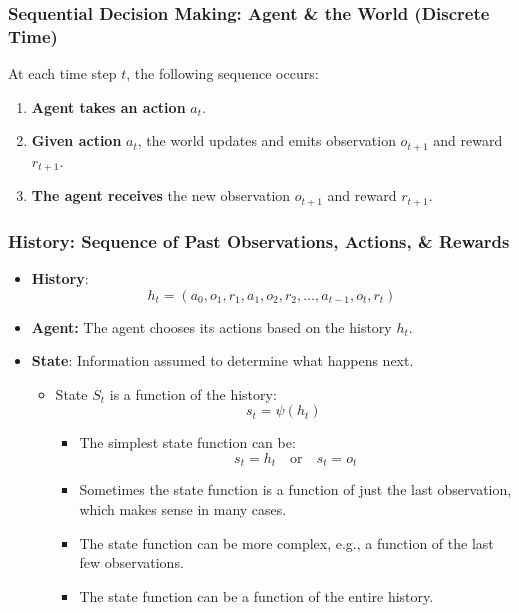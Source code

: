 \subsubsection{Sequential Decision Making: Agent \& the World (Discrete Time)}
\begin{definition}
    At each time step \( t \), the following sequence occurs:
    \begin{enumerate}
        \item \textbf{Agent takes an action} \( a_t \).
        \item \textbf{Given action} \( a_t \), the world updates and emits observation \( o_{t+1} \) and reward \( r_{t+1} \).
        \item \textbf{The agent receives} the new observation \( o_{t+1} \) and reward \( r_{t+1} \).
    \end{enumerate}
\end{definition}

\subsubsection{History: Sequence of Past Observations, Actions, \& Rewards}
\begin{definition}
    \begin{itemize}
        \item \textbf{History}:
        \[
        h_t = (a_0, o_1, r_1, a_1, o_2, r_2, \ldots, a_{t-1}, o_t, r_t)
        \]

        \item \textbf{Agent:} The agent chooses its actions based on the history \( h_t \).
        
        \item \textbf{State}: Information assumed to determine what happens next.
        \begin{itemize}
            \item State \( S_t \) is a function of the history:
            \[
            s_t = \psi(h_t)
            \]
            \begin{itemize}
                \item The simplest state function can be:
                \[
                s_t = h_t \quad \text{or} \quad s_t = o_t
                \]
                \item Sometimes the state function is a function of just the last observation, which makes sense in many cases.
                \item The state function can be more complex, e.g., a function of the last few observations.
                \item The state function can be a function of the entire history.
            \end{itemize}
        \end{itemize}
    \end{itemize}
\end{definition}

